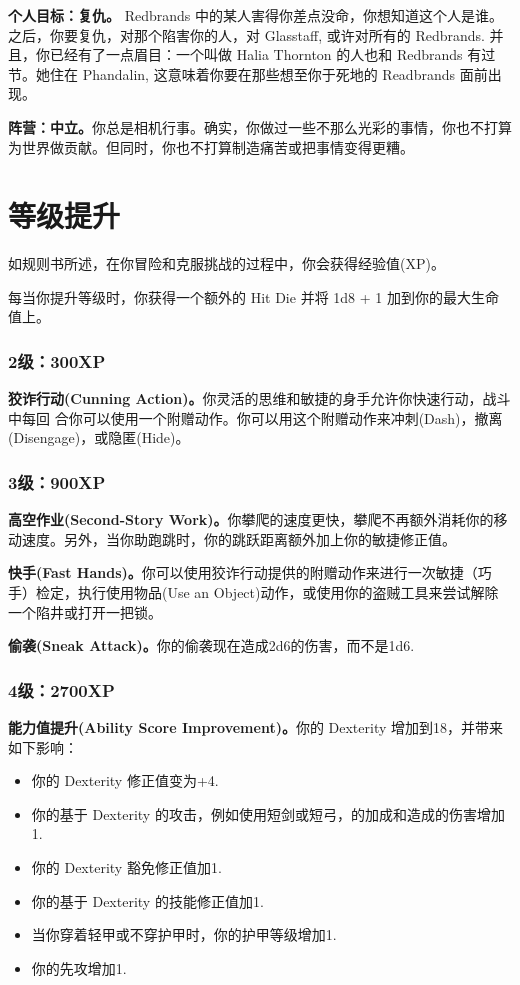 \documentclass[letterpaper,twocolumn,openany,nodeprecatedcode]{dndbook}
\begin{document}
\textbf{个人目标：复仇。} Redbrands 中的某人害得你差点没命，你想知道这个人是谁。之后，你要复仇，对那个陷害你的人，对 Glasstaff, 或许对所有的 Redbrands. 并且，你已经有了一点眉目：一个叫做 Halia Thornton 的人也和 Redbrands 有过节。她住在 Phandalin, 这意味着你要在那些想至你于死地的 Readbrands 面前出现。

\textbf{阵营：中立。}你总是相机行事。确实，你做过一些不那么光彩的事情，你也不打算为世界做贡献。但同时，你也不打算制造痛苦或把事情变得更糟。

\section{等级提升}

如规则书所述，在你冒险和克服挑战的过程中，你会获得经验值(XP)。

每当你提升等级时，你获得一个额外的 Hit Die 并将 1d8 + 1 加到你的最大生命值上。

\subsubsection{2级：300XP}

\textbf{狡诈行动(Cunning Action)。}你灵活的思维和敏捷的身手允许你快速行动，战斗中每回 合你可以使用一个附赠动作。你可以用这个附赠动作来冲刺(Dash)，撤离(Disengage)，或隐匿(Hide)。

\subsubsection{3级：900XP}
\textbf{高空作业(Second-Story Work)。}你攀爬的速度更快，攀爬不再额外消耗你的移动速度。另外，当你助跑跳时，你的跳跃距离额外加上你的敏捷修正值。

\textbf{快手(Fast Hands)。}你可以使用狡诈行动提供的附赠动作来进行一次敏捷（巧手）检定，执行使用物品(Use an Object)动作，或使用你的盗贼工具来尝试解除一个陷井或打开一把锁。

\textbf{偷袭(Sneak Attack)。}你的偷袭现在造成2d6的伤害，而不是1d6.

\subsubsection{4级：2700XP}
\textbf{能力值提升(Ability Score Improvement)。}你的 Dexterity 增加到18，并带来如下影响：
\begin{itemize}
\item 你的 Dexterity 修正值变为+4.
\item 你的基于 Dexterity 的攻击，例如使用短剑或短弓，的加成和造成的伤害增加1.
\item 你的 Dexterity 豁免修正值加1.
\item 你的基于 Dexterity 的技能修正值加1.
\item 当你穿着轻甲或不穿护甲时，你的护甲等级增加1.
\item 你的先攻增加1.
\end{itemize}
\end{document}
